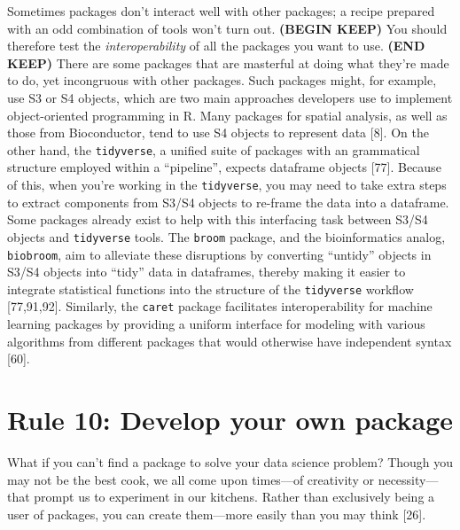 \documentclass[10pt,letterpaper]{article}
\begin{document}
Sometimes packages don't interact well with other packages; a recipe
prepared with an odd combination of tools won't turn out. \textbf{(BEGIN
KEEP)} You should therefore test the \emph{interoperability} of all the
packages you want to use. \textbf{(END KEEP)} There are some packages
that are masterful at doing what they're made to do, yet incongruous
with other packages. Such packages might, for example, use S3 or S4
objects, which are two main approaches developers use to implement
object-oriented programming in R. Many packages for spatial analysis, as
well as those from Bioconductor, tend to use S4 objects to represent
data {[}8{]}. On the other hand, the \texttt{tidyverse}, a unified suite
of packages with an grammatical structure employed within a
``pipeline'', expects dataframe objects {[}77{]}. Because of this, when
you're working in the \texttt{tidyverse}, you may need to take extra
steps to extract components from S3/S4 objects to re-frame the data into
a dataframe. Some packages already exist to help with this interfacing
task between S3/S4 objects and \texttt{tidyverse} tools. The
\texttt{broom} package, and the bioinformatics analog,
\texttt{biobroom}, aim to alleviate these disruptions by converting
``untidy'' objects in S3/S4 objects into ``tidy'' data in dataframes,
thereby making it easier to integrate statistical functions into the
structure of the \texttt{tidyverse} workflow {[}77,91,92{]}. Similarly,
the \texttt{caret} package facilitates interoperability for machine
learning packages by providing a uniform interface for modeling with
various algorithms from different packages that would otherwise have
independent syntax {[}60{]}.

\hypertarget{rule-10-develop-your-own-package}{%
\section{Rule 10: Develop your own
package}\label{rule-10-develop-your-own-package}}

What if you can't find a package to solve your data science problem?
Though you may not be the best cook, we all come upon times---of
creativity or necessity---that prompt us to experiment in our kitchens.
Rather than exclusively being a user of packages, you can create
them---more easily than you may think {[}26{]}.
\end{document}
